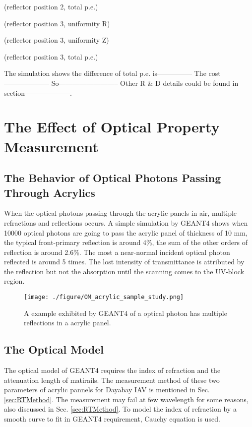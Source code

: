 (reflector position 2, total p.e.)




(reflector position 3, uniformity R)




(reflector position 3, uniformity Z)




(reflector position 3, total p.e.)


The simulation shows the difference of total p.e. is---------------
The cost--------------------
So--------------------------
Other R \& D details could be found in section--------------------.


\section {The Effect of Optical Property Measurement}
\subsection {The Behavior of Optical Photons Passing Through Acrylics}

When the optical photons passing through the acrylic panels in air, multiple refractions
and reflections occurs. A simple simulation by GEANT4 shows when 10000 optical photons
are going to pass the acrylic panel of thickness of 10 mm, the typical front-primary
reflection is around 4\%, the sum of the other orders of reflection is around 2.6\%.
The most a near-normal incident optical photon reflected is around 5 times.
The lost intensity of transmittance is attributed by the reflection but not the
absorption until the scanning comes to the UV-block region.


\begin{figure}[h]
    \centering
    \texttt{[image: ./figure/OM\_acrylic\_sample\_study.png]}
    \caption[A example exhibited by GEANT4 of a optical photon has multiple reflections in a acrylic panel.]
{
A example exhibited by GEANT4 of a optical photon has multiple reflections in a acrylic panel.
}
    \label{fig:OM_acrylic_sample_study.png}
    \end{figure}


\subsection {The Optical Model}
\label{sec:opticalModel}

The optical model of GEANT4 requires the index of refraction and the attenuation length
of matirails. The measurement method of these two parameters of acrylic pannels for Dayabay IAV
is mentioned in Sec. \ref{sec:RTMethod}.
The measurement may fail at few wavelength for some reasons, also discussed
in Sec. \ref{sec:RTMethod}.
To model the index of refraction by a smooth curve to fit in GEANT4 requirement, Cauchy equation
is used.

